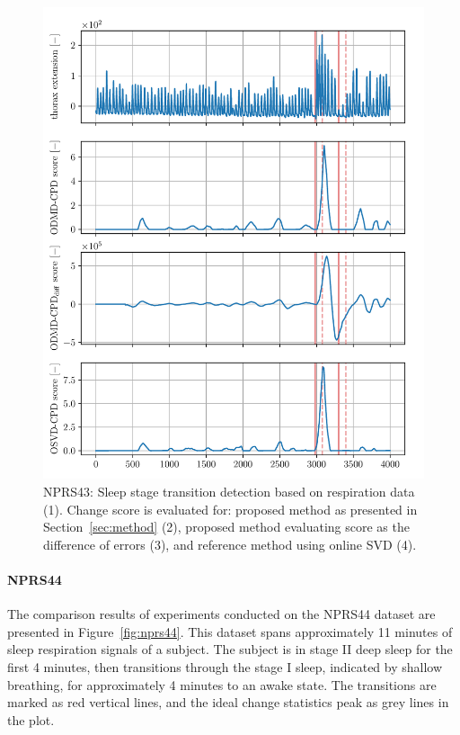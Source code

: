 \begin{figure}
	\centering
	\includegraphics[width=\linewidth]{figures/nprs43-chd_r2-roll_301-dmd_w1.0-h80.pdf}
	\caption{NPRS43: Sleep stage transition detection based on respiration data (1). Change score is evaluated for: proposed method as presented in Section~\ref{sec:method} (2), proposed method evaluating score as the difference of errors (3), and reference method using online SVD (4).}\label{fig:nprs43}
\end{figure}

\paragraph{NPRS44}
The comparison results of experiments conducted on the NPRS44 dataset are presented in Figure~\ref{fig:nprs44}. This dataset spans approximately 11 minutes of sleep respiration signals of a subject. The subject is in stage II deep sleep for the first 4 minutes, then transitions through the stage I sleep, indicated by shallow breathing, for approximately 4 minutes to an awake state. The transitions are marked as red vertical lines, and the ideal change statistics peak as grey lines in the plot.

